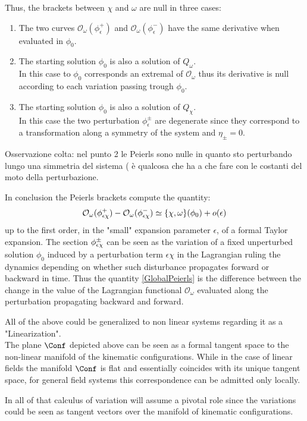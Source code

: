 \documentclass[Main]{subfiles}
\begin{document}
		Thus, the brackets between $\chi$ and $\omega$ are null in three cases:
		\begin{enumerate}
			\item The two curves $\mathcal{O}_\omega ( \phi_\epsilon^+)$ and $\mathcal{O}_\omega ( \phi_\epsilon^-)$ have the same derivative when evaluated in $\phi_0$.
			\item The starting solution $\phi_0$ is also a solution of $Q_\omega$.\\
				In this case to $\phi_0$ corresponds an extremal of $\mathcal{O}_\omega$ thus its derivative is null according to each variation passing trough $\phi_0$.
			\item The starting solution $\phi_0$ is also a solution of $Q_\chi$.\\
				In this case the two perturbation $\phi_\epsilon^\pm$ are degenerate since they correspond to a transformation along a symmetry of the system and $ \eta_\pm = 0$.
		\end{enumerate}
\ifToninus
		\begin{Warning}
			Osservazione colta: nel punto 2 le Peierls sono nulle in quanto sto perturbando lungo una simmetria del sistema ( è qualcosa che ha a che fare con le costanti del moto della perturbazione.
		\end{Warning}
\fi
		
		In conclusion the Peierls brackets compute the quantity:
		\begin{equation}\label{GlobalPeierls}
			\mathcal{O}_\omega ( \phi_{\tiny \epsilon\chi}^+)  - \mathcal{O}_\omega ( \phi_{\tiny \epsilon\chi}^-) \simeq  \{\chi, \omega \}(\phi_0)  + o(\epsilon)
		\end{equation}
		up to the first order, in the \ifToninus "small" \fi expansion parameter $\epsilon$, of a formal Taylor expansion.
		The section $\phi_{\tiny \epsilon\chi}^\pm$ can be seen as the variation of a fixed unperturbed solution $\phi_0$ induced by a perturbation term $\epsilon \chi$ in the Lagrangian ruling the dynamics depending on whether such disturbance propagates forward or backward in time.
		Thus the  quantity \ref{GlobalPeierls} is the difference between the change in the value of the Lagrangian functional $\mathcal{O}_\omega$ evaluated along  the perturbation propagating backward and forward.
		
		\begin{remark}
		All of the above could be generalized to non linear systems regarding it as a "Linearization".\\
		The plane $\Conf$ depicted above can be seen as a formal tangent space to the non-linear manifold of the kinematic configurations.
		While in the case of linear fields the manifold $\Conf$ is flat and essentially coincides with its unique tangent space, for general field systems  this correspondence can be admitted only locally.
		\end{remark}		
\ifToninus
	\begin{Warning}
				In all of that calculus of variation will assume a pivotal role since the variations could be seen as tangent vectors over the manifold of  kinematic configurations.
	\end{Warning}
\fi	
		
\end{document}
